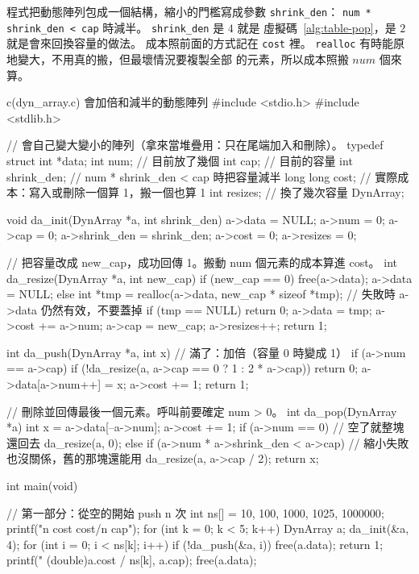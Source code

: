 程式把動態陣列包成一個結構，縮小的門檻寫成參數 \texttt{shrink\_den}：
\texttt{num * shrink\_den < cap} 時減半。 \texttt{shrink\_den} 是 $4$ 就是
虛擬碼~\ref{alg:table-pop}，是 $2$ 就是會來回換容量的做法。 成本照前面的方式記在
\texttt{cost} 裡。 \texttt{realloc} 有時能原地變大，不用真的搬，但最壞情況要複製全部
的元素，所以成本照搬 $\mathit{num}$ 個來算。

\begin{example}[label=ex:dyn-array]{c}{(dyn\_array.c) 會加倍和減半的動態陣列}
#include <stdio.h>
#include <stdlib.h>

// 會自己變大變小的陣列（拿來當堆疊用：只在尾端加入和刪除）。
typedef struct {
    int *data;
    int num;            // 目前放了幾個
    int cap;            // 目前的容量
    int shrink_den;     // num * shrink_den < cap 時把容量減半
    long long cost;     // 實際成本：寫入或刪除一個算 1，搬一個也算 1
    int resizes;        // 換了幾次容量
} DynArray;

void da_init(DynArray *a, int shrink_den)
{
    a->data = NULL;
    a->num = 0;
    a->cap = 0;
    a->shrink_den = shrink_den;
    a->cost = 0;
    a->resizes = 0;
}

// 把容量改成 new_cap，成功回傳 1。搬動 num 個元素的成本算進 cost。
int da_resize(DynArray *a, int new_cap)
{
    if (new_cap == 0) {
        free(a->data);
        a->data = NULL;
    } else {
        int *tmp = realloc(a->data, new_cap * sizeof *tmp);
        // 失敗時 a->data 仍然有效，不要蓋掉
        if (tmp == NULL) {
            return 0;
        }
        a->data = tmp;
    }
    a->cost += a->num;
    a->cap = new_cap;
    a->resizes++;
    return 1;
}

int da_push(DynArray *a, int x)
{
    // 滿了：加倍（容量 0 時變成 1）
    if (a->num == a->cap) {
        if (!da_resize(a, a->cap == 0 ? 1 : 2 * a->cap)) {
            return 0;
        }
    }
    a->data[a->num++] = x;
    a->cost += 1;
    return 1;
}

// 刪除並回傳最後一個元素。呼叫前要確定 num > 0。
int da_pop(DynArray *a)
{
    int x = a->data[--a->num];
    a->cost += 1;
    if (a->num == 0) {                  // 空了就整塊還回去
        da_resize(a, 0);
    } else if (a->num * a->shrink_den < a->cap) {
        // 縮小失敗也沒關係，舊的那塊還能用
        da_resize(a, a->cap / 2);
    }
    return x;
}

int main(void)
{
    // 第一部分：從空的開始 push n 次
    int ns[] = {10, 100, 1000, 1025, 1000000};
    printf("n cost cost/n cap\n");
    for (int k = 0; k < 5; k++) {
        DynArray a;
        da_init(&a, 4);
        for (int i = 0; i < ns[k]; i++) {
            if (!da_push(&a, i)) {
                free(a.data);
                return 1;
            }
        }
        printf("%
               (double)a.cost / ns[k], a.cap);
        free(a.data);
    }

}
\end{example}
